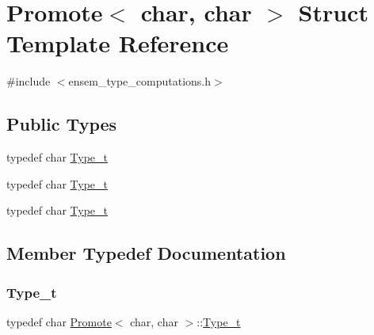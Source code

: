 \hypertarget{structPromote_3_01char_00_01char_01_4}{}\section{Promote$<$ char, char $>$ Struct Template Reference}
\label{structPromote_3_01char_00_01char_01_4}


{\ttfamily \#include $<$ensem\+\_\+type\+\_\+computations.\+h$>$}

\subsection*{Public Types}
\begin{DoxyCompactItemize}
\item 
typedef char \mbox{\hyperlink{structPromote_3_01char_00_01char_01_4_abf9ddff19f7af67343d88997bbe4d874}{Type\+\_\+t}}
\item 
typedef char \mbox{\hyperlink{structPromote_3_01char_00_01char_01_4_abf9ddff19f7af67343d88997bbe4d874}{Type\+\_\+t}}
\item 
typedef char \mbox{\hyperlink{structPromote_3_01char_00_01char_01_4_abf9ddff19f7af67343d88997bbe4d874}{Type\+\_\+t}}
\end{DoxyCompactItemize}


\subsection{Member Typedef Documentation}
\mbox{\label{structPromote_3_01char_00_01char_01_4_abf9ddff19f7af67343d88997bbe4d874}} 
\subsubsection{\texorpdfstring{Type\_t}{Type\_t}\hspace{0.1cm}{\footnotesize\ttfamily [1/3]}}
{\footnotesize\ttfamily typedef char \mbox{\hyperlink{structPromote}{Promote}}$<$ char, char $>$\+::\mbox{\hyperlink{structPromote_3_01char_00_01char_01_4_abf9ddff19f7af67343d88997bbe4d874}{Type\+\_\+t}}}

\mbox{\label{structPromote_3_01char_00_01char_01_4_abf9ddff19f7af67343d88997bbe4d874}} 
